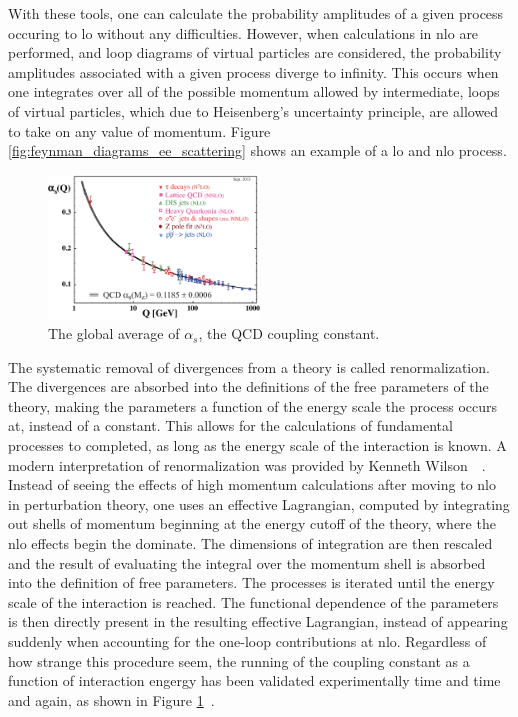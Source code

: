 \par With these tools, one can calculate the probability amplitudes of
a given process occuring to \acrfull{lo} without any
difficulties.  However, when calculations in \acrfull{nlo} are
performed, and loop diagrams of virtual particles are considered, the
probability amplitudes associated with a given process diverge to
infinity.  This occurs when one integrates over all of the 
possible momentum allowed by intermediate, loops of virtual particles,
which due to Heisenberg's uncertainty principle, are allowed to take
on any value of momentum.  Figure
\ref{fig:feynman_diagrams_ee_scattering} shows an example of a
\acrshort{lo} and \acrshort{nlo} process.

\begin{figure}[h]
  \centering
  \includegraphics[width=0.5\textwidth]{Figures/Experimental_Results/asq-2013.eps}
  \caption{The global average of $\alpha_{s}$, the QCD coupling
    constant.}\label{fig:globalAvgAlphaS}
\end{figure}

\par The systematic removal of divergences from a theory is called
renormalization.  The divergences are absorbed into the
definitions of the free parameters of the theory, making the parameters a function of
the energy scale the process occurs at, instead of a constant.  This
allows for the calculations of fundamental processes to completed,
as long as the energy scale of the interaction is known.  A modern
interpretation of renormalization was provided by Kenneth
Wilson~\cite{th:Wilson_renormalization1}~\cite{th:Wilson_renormalization2}.
Instead of seeing the effects of high momentum calculations after
moving to \acrshort{nlo} in perturbation theory, one uses an effective Lagrangian,
computed by integrating out shells of momentum beginning at the energy
cutoff of the theory, where the \acrshort{nlo} effects begin the
dominate.  The dimensions of integration are then rescaled and the
result of evaluating the integral over the momentum shell is absorbed
into the definition of free parameters.  The processes is iterated
until the energy scale of the interaction is reached.  The functional 
dependence of the parameters is then  directly present in the resulting
effective Lagrangian, instead of appearing suddenly when accounting
for the one-loop contributions at \acrshort{nlo}.  Regardless of how
strange this procedure seem, the running of the coupling constant as a
function of interaction engergy has been validated experimentally time
and time and again, as shown in Figure \ref{fig:globalAvgAlphaS}~\cite{Bethke_WorldAvgAlphaS_QCD}.



